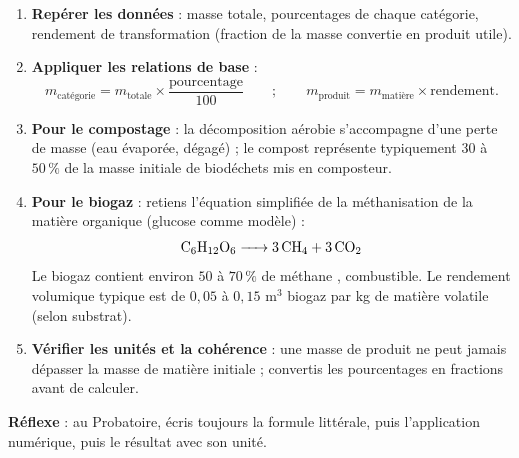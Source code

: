 \documentclass[11pt]{article}
\begin{document}
\begin{methode}
\begin{enumerate}
\item \textbf{Repérer les données} : masse totale, pourcentages de chaque catégorie, rendement de transformation (fraction de la masse convertie en produit utile).
\item \textbf{Appliquer les relations de base} :
\[ m_{\text{catégorie}} = m_{\text{totale}} \times \dfrac{\text{pourcentage}}{100} \qquad ; \qquad m_{\text{produit}} = m_{\text{matière}} \times \text{rendement}. \]
\item \textbf{Pour le compostage} : la décomposition aérobie s'accompagne d'une perte de masse (eau évaporée,  dégagé) ; le compost représente typiquement $30$ à $50\,\%$ de la masse initiale de biodéchets mis en composteur.
\item \textbf{Pour le biogaz} : retiens l'équation simplifiée de la méthanisation de la matière organique (glucose comme modèle) :
\[ \ce{C6H12O6 -> 3CH4 + 3CO2} \]
Le biogaz contient environ $50$ à $70\,\%$ de méthane , combustible. Le rendement volumique typique est de $0{,}05$ à $0{,}15$ m$^3$ biogaz par kg de matière volatile (selon substrat).
\item \textbf{Vérifier les unités et la cohérence} : une masse de produit ne peut jamais dépasser la masse de matière initiale ; convertis les pourcentages en fractions avant de calculer.
\end{enumerate}
\textbf{Réflexe} : au Probatoire, écris toujours la formule littérale, puis l'application numérique, puis le résultat avec son unité.
\end{methode}
\end{document}
